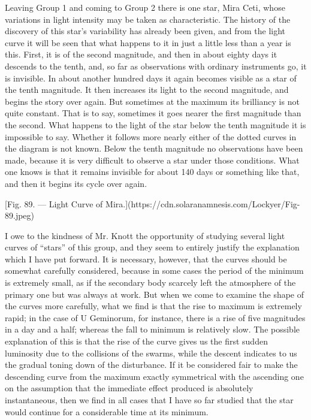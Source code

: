 \documentclass[a4paper, 12pt, oneside, polutonikogreek, english]{article}
\begin{document}
Leaving Group 1 and coming to Group 2 there is one star, Mira Ceti, whose variations in light intensity may be taken as characteristic. The history of the discovery of this star's variability has already been given, and from the light curve it will be seen that what happens to it in just a little less than a year is this. First, it is of the second magnitude, and then in about eighty days it descends to the tenth, and, so far as observations with ordinary instruments go, it is invisible. In about another hundred days it again becomes visible as a star of the tenth magnitude. It then increases its light to the second magnitude, and begins the story over again. But sometimes at the maximum its brilliancy is not quite constant. That is to say, sometimes it goes nearer the first magnitude than the second. What happens to the light of the star below the tenth magnitude it is impossible to say. Whether it follows more nearly either of the dotted curves in the diagram is not known. Below the tenth magnitude no observations have been made, because it is very difficult to observe a star under those conditions. What one knows is that it remains invisible for about 140 days or something like that, and then it begins its cycle over again.

[Fig. 89. --- Light Curve of Mira.](https://cdn.solaranamnesis.com/Lockyer/Fig-89.jpeg)

I owe to the kindness of Mr. Knott the opportunity of studying several light curves of ``stars'' of this group, and they seem to entirely justify the explanation which I have put forward. It is necessary, however, that the curves should be somewhat carefully considered, because in some cases the period of the minimum is extremely small, as if the secondary body scarcely left the atmosphere of the primary one but was always at work. But when we come to examine the shape of the curves more carefully, what we find is that the rise to maximum is extremely rapid; in the case of U Geminorum, for instance, there is a rise of five magnitudes in a day and a half; whereas the fall to minimum is relatively slow. The possible explanation of this is that the rise of the curve gives us the first sudden luminosity due to the collisions of the swarms, while the descent indicates to us the gradual toning down of the disturbance. If it be considered fair to make the descending curve from the maximum exactly symmetrical with the ascending one on the assumption that the immediate effect produced is absolutely instantaneous, then we find in all cases that I have so far studied that the star would continue for a considerable time at its minimum.
\end{document}
